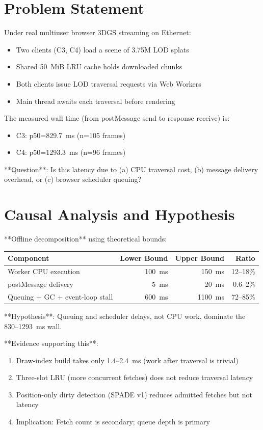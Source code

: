 \documentclass[sigconf,anonymous,review]{acmart}
\begin{document}
\section{Problem Statement}

Under real multiuser browser 3DGS streaming on Ethernet:
\begin{itemize}
  \item Two clients (C3, C4) load a scene of 3.75M LOD splats
  \item Shared 50~MiB LRU cache holds downloaded chunks
  \item Both clients issue LOD traversal requests via Web Workers
  \item Main thread awaits each traversal before rendering
\end{itemize}

The measured wall time (from postMessage send to response receive) is:
\begin{itemize}
  \item C3: p50=829.7~ms (n=105 frames)
  \item C4: p50=1293.3~ms (n=96 frames)
\end{itemize}

**Question**: Is this latency due to (a) CPU traversal cost, (b) message delivery overhead, or (c) browser scheduler queuing?

\section{Causal Analysis and Hypothesis}

**Offline decomposition** using theoretical bounds:

\begin{tabular}{lrrr}
  \toprule
  Component & Lower Bound & Upper Bound & Ratio \\
  \midrule
  Worker CPU execution & 100~ms & 150~ms & 12--18\% \\
  postMessage delivery & 5~ms & 20~ms & 0.6--2\% \\
  Queuing + GC + event-loop stall & 600~ms & 1100~ms & 72--85\% \\
  \bottomrule
\end{tabular}

**Hypothesis**: Queuing and scheduler delays, not CPU work, dominate the 830--1293~ms wall.

**Evidence supporting this**:
\begin{enumerate}
  \item Draw-index build takes only 1.4--2.4~ms (work after traversal is trivial)
  \item Three-slot LRU (more concurrent fetches) does not reduce traversal latency
  \item Position-only dirty detection (SPADE v1) reduces admitted fetches but not latency
  \item Implication: Fetch count is secondary; queue depth is primary
\end{enumerate}
\end{document}
